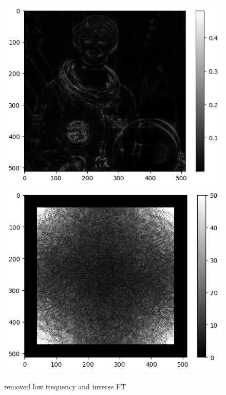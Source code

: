 \documentclass{beamer}
\begin{document}
\begin{frame}
\begin{columns}
			\begin{column}{0.4\textwidth}
				\begin{figure}\label{fig5}
					\begin{center}
						\includegraphics[scale=0.22]{fig6.png}
						\includegraphics[scale=0.22]{fig5.png}
					\end{center}
				\caption{removed low frequency and inverse FT}
				\end{figure}
			\end{column}
		\end{columns}
		
	\end{frame}
\end{document}

